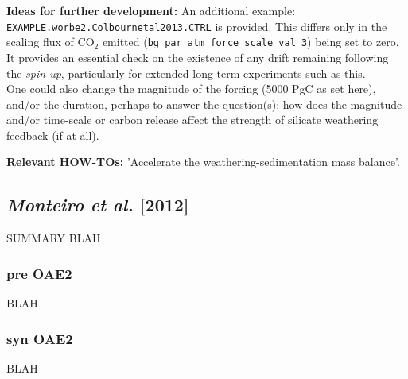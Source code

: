 \documentclass[10pt,twoside]{article}
\begin{document}
\noindent \textbf{Ideas for further development:} An additional example: \texttt{EXAMPLE.worbe2.Colbournetal2013.CTRL} is provided. This differs only in the scaling flux of CO$_{2}$ emitted (\texttt{bg\_par\_atm\_force\_scale\_val\_3}) being set to zero. It provides an essential check on the existence of any drift remaining following the \textit{spin-up}, particularly for extended long-term experiments such as this.
\\One could also change the magnitude of the forcing (5000 PgC as set here), and/or the duration, perhaps to answer the question(s): how does the magnitude and/or time-scale or carbon release affect the strength of silicate weathering feedback (if at all). 

\noindent \textbf{Relevant HOW-TOs:} 'Accelerate the weathering-sedimentation mass balance'.


\subsection{\textit{Monteiro et al.} [2012]}

SUMMARY BLAH


\subsubsection{pre OAE2}\label{EXAMPLE.p0093k.Monteiroetal2012 PREOAE2.SPIN}

BLAH


\subsubsection{syn OAE2}\label{EXAMPLE.p0093k.Monteiroetal2012 OAE2.SPIN}

BLAH

\end{document}
